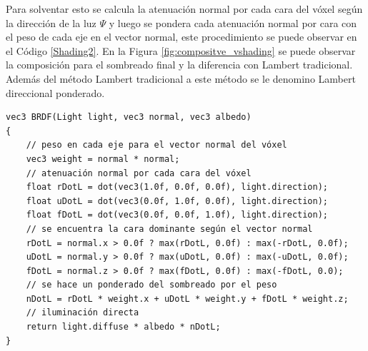 \noindent Para solventar esto se calcula la atenuación normal por cada cara del vóxel según la dirección de la luz $\Psi$ y luego se pondera cada atenuación normal por cara con el peso de cada eje en el vector normal, este procedimiento se puede observar en el Código \ref{Shading2}. En la Figura \ref{fig:compositve_vshading} se puede observar la composición para el sombreado final y la diferencia con Lambert tradicional. Además del método Lambert tradicional a este método se le denomino Lambert direccional ponderado.
\\
\begin{lstlisting}[caption={Sombreado direccional y ponderado según el vector normal para un vóxel}, label=Shading2]
vec3 BRDF(Light light, vec3 normal, vec3 albedo)
{
	// peso en cada eje para el vector normal del vóxel
    vec3 weight = normal * normal;
    // atenuación normal por cada cara del vóxel
    float rDotL = dot(vec3(1.0f, 0.0f, 0.0f), light.direction);
    float uDotL = dot(vec3(0.0f, 1.0f, 0.0f), light.direction);
    float fDotL = dot(vec3(0.0f, 0.0f, 1.0f), light.direction);
    // se encuentra la cara dominante según el vector normal
    rDotL = normal.x > 0.0f ? max(rDotL, 0.0f) : max(-rDotL, 0.0f);
    uDotL = normal.y > 0.0f ? max(uDotL, 0.0f) : max(-uDotL, 0.0f);
    fDotL = normal.z > 0.0f ? max(fDotL, 0.0f) : max(-fDotL, 0.0);
    // se hace un ponderado del sombreado por el peso
    nDotL = rDotL * weight.x + uDotL * weight.y + fDotL * weight.z;
    // iluminación directa
    return light.diffuse * albedo * nDotL;
}
\end{lstlisting}

